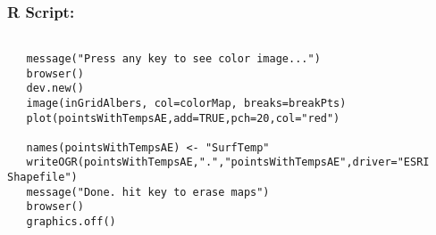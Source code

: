 \documentclass{beamer}
\begin{document}
\begin{frame}[fragile]
\frametitle{R Script:}
\begin{framed}
\begin{verbatim}
   
   message("Press any key to see color image...")  
   browser() 
   dev.new()
   image(inGridAlbers, col=colorMap, breaks=breakPts)
   plot(pointsWithTempsAE,add=TRUE,pch=20,col="red")                
       
   names(pointsWithTempsAE) <- "SurfTemp"    
   writeOGR(pointsWithTempsAE,".","pointsWithTempsAE",driver="ESRI Shapefile")
   message("Done. hit key to erase maps")  
   browser()     
   graphics.off() 
\end{verbatim}
\end{framed}
\end{frame}
\end{document}
